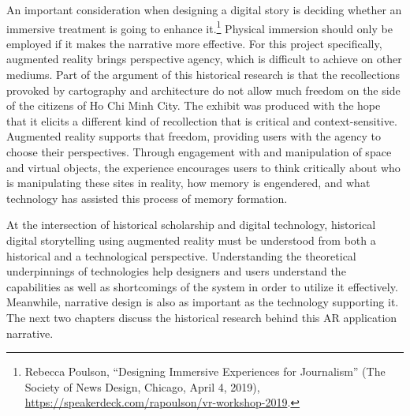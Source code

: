 An important consideration when designing a digital story is deciding whether an immersive treatment is going to enhance it.\footnote{Rebecca Poulson, “Designing Immersive Experiences for Journalism” (The Society of News Design, Chicago, April 4, 2019), \url{https://speakerdeck.com/rapoulson/vr-workshop-2019}.} Physical immersion should only be employed if it makes the narrative more effective. For this project specifically, augmented reality brings perspective agency, which is difficult to achieve on other mediums. Part of the argument of this historical research is that the recollections provoked by cartography and architecture do not allow much freedom on the side of the citizens of Ho Chi Minh City. The exhibit was produced with the hope that it elicits a different kind of recollection that is critical and context-sensitive. Augmented reality supports that freedom, providing users with the agency to choose their perspectives. Through engagement with and manipulation of space and virtual objects, the experience encourages users to think critically about who is manipulating these sites in reality, how memory is engendered, and what technology has assisted this process of memory formation.

At the intersection of historical scholarship and digital technology, historical digital storytelling using augmented reality must be understood from both a historical and a technological perspective. Understanding the theoretical underpinnings of technologies help designers and users understand the capabilities as well as shortcomings of the system in order to utilize it effectively. Meanwhile, narrative design is also as important as the technology supporting it. The next two chapters discuss the historical research behind this AR application narrative.
